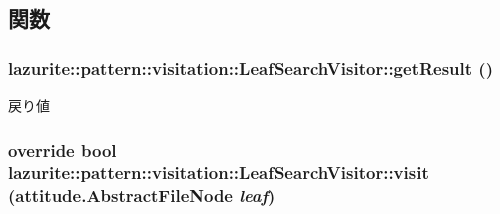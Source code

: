 \subsection{関数}
\hypertarget{classlazurite_1_1pattern_1_1visitation_1_1_leaf_search_visitor_a96e6823eb116d8d8f8670b47dbd9ac7e}{
\subsubsection[{getResult}]{ lazurite::pattern::visitation::LeafSearchVisitor::getResult ()}}
\label{classlazurite_1_1pattern_1_1visitation_1_1_leaf_search_visitor_a96e6823eb116d8d8f8670b47dbd9ac7e}
\begin{DoxyReturn}{戻り値}

\end{DoxyReturn}
\hypertarget{classlazurite_1_1pattern_1_1visitation_1_1_leaf_search_visitor_aa6ddfe4f263ca1bc56baf0e257dbcc52}{
\subsubsection[{visit}]{\setlength{\rightskip}{0pt plus 5cm}override bool lazurite::pattern::visitation::LeafSearchVisitor::visit ({\bf attitude.AbstractFileNode} {\em leaf})}}
\label{classlazurite_1_1pattern_1_1visitation_1_1_leaf_search_visitor_aa6ddfe4f263ca1bc56baf0e257dbcc52}

